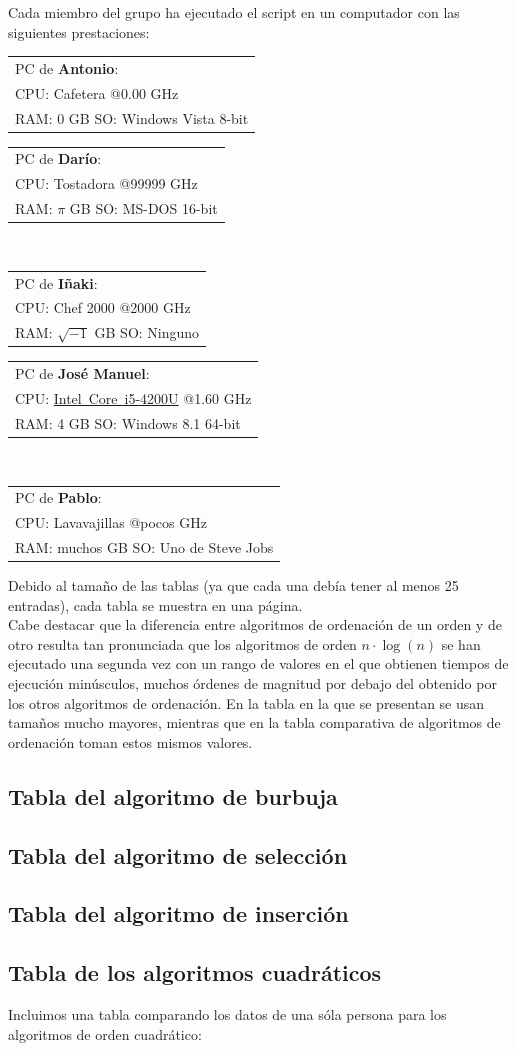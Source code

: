 \documentclass[a4paper, 11pt]{article}
\makeatletter
\newcommand{\spec}[5]{
\bgroup
\def\arraystretch{1.2}
\begin{tabular}{|l|}
\hline
PC de \textbf{#1}:\\
CPU: #2 @#3 GHz\\RAM: #4 GB \hspace{0.8cm} SO: #5 \\
\hline
\end{tabular}
\egroup
\vspace*{0.2cm}
}
\makeatother
\begin{document}
Cada miembro del grupo ha ejecutado el script en un computador con las siguientes prestaciones:

\noindent
\spec{Antonio}{Cafetera}{0.00}{0}{Windows Vista 8-bit}
\spec{Darío}{Tostadora}{99999}{$\pi$}{MS-DOS 16-bit} \\
\spec{Iñaki}{Chef 2000}{2000}{$\sqrt{-1}$}{Ninguno}
\spec{José Manuel}{\href{http://ark.intel.com/es-es/products/75459/}{Intel\textregistered\ Core\texttrademark\ i5-4200U}}{1.60}{4}{Windows 8.1 64-bit} \\
\spec{Pablo}{Lavavajillas}{pocos}{muchos}{Uno de Steve Jobs}

Debido al tamaño de las tablas (ya que cada una debía tener al menos 25 entradas),
cada tabla se muestra en una página. \\

Cabe destacar que la diferencia entre algoritmos de ordenación de un orden y de
otro resulta tan pronunciada que los algoritmos de orden $n \cdot \log (n)$ se
han ejecutado una segunda vez con un rango de valores en el que obtienen tiempos
de ejecución minúsculos, muchos órdenes de magnitud por debajo del obtenido por
los otros algoritmos de ordenación. En la tabla en la que se presentan se usan
tamaños mucho mayores, mientras que en la tabla comparativa de algoritmos de
ordenación toman estos mismos valores.

\subsection{Tabla del algoritmo de burbuja}


\subsection{Tabla del algoritmo de selección}


\subsection{Tabla del algoritmo de inserción}


\newpage
\subsection{Tabla de los algoritmos cuadráticos}

\noindent Incluimos una tabla comparando los datos de una sóla persona para los algoritmos de orden cuadrático: \\
\end{document}
